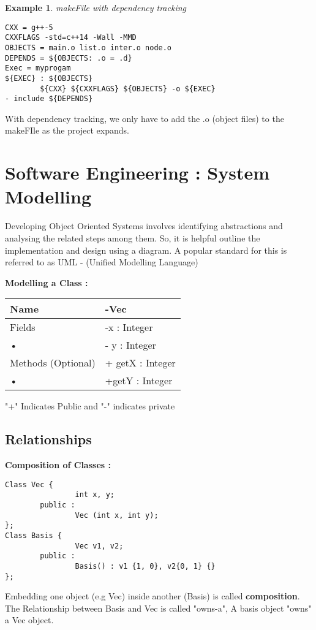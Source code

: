 \documentclass{article}
\newtheorem{ex}[theorem]{Example}
\begin{document}
\begin{ex} makeFile with dependency tracking 
\begin{lstlisting}
CXX = g++-5
CXXFLAGS -std=c++14 -Wall -MMD
OBJECTS = main.o list.o inter.o node.o 
DEPENDS = ${OBJECTS: .o = .d}
Exec = myprogam 
${EXEC} : ${OBJECTS}
		${CXX} ${CXXFLAGS} ${OBJECTS} -o ${EXEC}
- include ${DEPENDS}
\end{lstlisting}
\end{ex}

With dependency tracking, we only have to add the .o (object files) to the makeFIle as the project expands.

\section{Software Engineering : System Modelling }

Developing Object Oriented Systems  involves identifying abstractions and analysing the related steps among them. So, it is helpful outline the implementation and design using a diagram. A popular standard for this is referred to as UML - (Unified Modelling Language)  

\textbf{Modelling a Class : }
\begin{center}
\begin{tabular}{|l|l|}
\hline 
Name & -Vec \\ 
\hline 
Fields  & -x : Integer \\ 
\hline 
• & - y : Integer  \\ 
\hline 
Methods (Optional) & + getX : Integer \\ 
\hline 
• & +getY : Integer \\ 
\hline 
\end{tabular} 
"+" Indicates Public and "-" indicates private
\end{center}


\subsection{Relationships}

\textbf{Composition of Classes :}
\begin{lstlisting}
Class Vec {
				int x, y; 
		public : 
				Vec (int x, int y); 
};
Class Basis {
				Vec v1, v2;
		public :
				Basis() : v1 {1, 0}, v2{0, 1} {}
};	
\end{lstlisting}
Embedding one object (e.g Vec) inside another (Basis) is called \textbf{composition}. The Relationship between Basis and Vec is called "owns-a", A basis object "owns" a Vec object.
\end{document}
